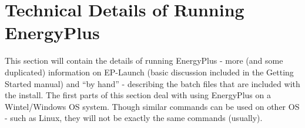 \chapter{Technical Details of Running EnergyPlus}\label{technical-details-of-running-energyplus}

This section will contain the details of running EnergyPlus - more (and some duplicated) information on EP-Launch (basic discussion included in the Getting Started manual) and ``by hand'' - describing the batch files that are included with the install. The first parts of this section deal with using EnergyPlus on a Wintel/Windows OS system. Though similar commands can be used on other OS - such as Linux, they will not be exactly the same commands (usually).
